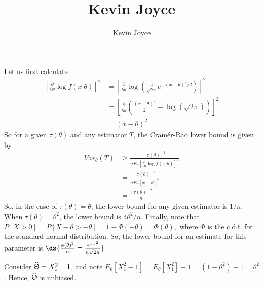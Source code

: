 \documentclass{stat_homework}
\title{Kevin Joyce}
\author{Kevin Joyce}
\begin{document}
 
\renewcommand{\bar}{\overline}
\renewcommand{\hat}{\widehat}
\renewcommand{\SS}{\mathcal S}
\newcommand{\eps}{\varepsilon}
\newcommand{\todist}{\stackrel{D}\longrightarrow}
\newcommand{\toprob}{\stackrel{p}\longrightarrow}
\newcommand{\TTheta}{\overline{\underline \Theta} }
\newcommand{\del}{\partial}


\begin{solution}
  Let us first calculate
  \begin{align*}
    \left[\frac{\del}{\del\theta} \log f(x|\theta)\right]^2 
    &= \left[ \frac{\del}{\del\theta} \log \left( \frac{1}{\sqrt{2\pi}} e^{-(x-\theta)^2/2} \right) \right]^2 \\
    &= \left[ \frac{\del}{\del\theta} \left(\frac{(x-\theta)^2}{2} - \log(\sqrt{2\pi})\right) \right]^2\\
    &= (x-\theta)^2
  \end{align*}
  So for a given $\tau(\theta)$ and any estimator $T$, the Cram\'er-Rao lower bound is given by 
  \begin{align*}
    Var_\theta(T) &\ge \frac{ [\tau(\theta)]^2 }{ n E_\theta \left[\frac{\del}{\del\theta} \log f(x|\theta)\right]^2 }\\
    & = \frac{ [\tau(\theta)]^2 }{ n E_\theta [x-\theta ]^2 }\\
    & = \frac{ [\tau(\theta)]^2 }{ n }
  \end{align*}
  So, in the case of $\tau(\theta) = \theta$, the lower bound for any given estimator is $1/n$. When $\tau(\theta) = \theta^2$, the lower bound is $4\theta^2/n$. Finally, note that $ P[X > 0] = P[X-\theta > -\theta] = 1-\Phi(-\theta) = \Phi(\theta),$ where $\Phi$ is the c.d.f. for the standard normal distribution.  So, the lower bound for an estimate for this parameter is $\ds{\frac{\phi(\theta)^2}n = \frac{e^{-x^2}}{n\sqrt{2\pi}}}$
\end{solution}



\begin{solution} 
  Consider $\hat\Uptheta = X_1^2 - 1$, and note $E_\theta[X_1^2 - 1] = E_\theta[X_1^2] - 1= (1 - \theta^2) -1 = \theta^2$.  Hence, $\hat\Uptheta$ is unbiased.
\end{solution}
\end{document}
